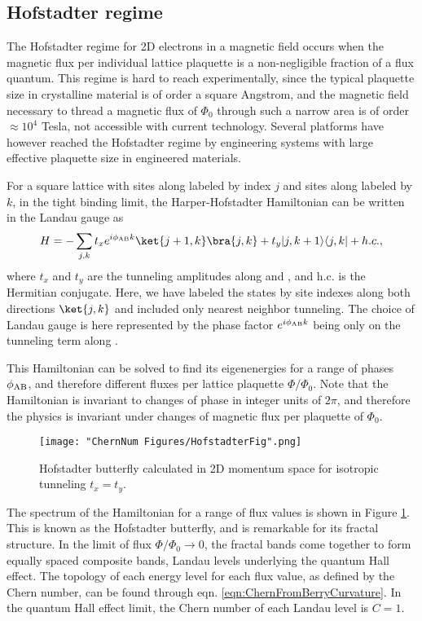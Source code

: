 \subsection{Hofstadter regime}
The Hofstadter regime\cite{Hofstadter1976} for 2D electrons in a magnetic field occurs when the magnetic flux per individual lattice plaquette is a non-negligible fraction of a flux quantum. This regime is hard to reach experimentally, since the typical plaquette size in crystalline material is of order a square Angstrom, and the magnetic field necessary to thread a magnetic flux of $\Phi_0$ through such a narrow area is of order $\approx10^4$ Tesla, not accessible with current technology. Several platforms have however reached the Hofstadter regime by engineering systems with large effective plaquette size in engineered materials\cite{Geisler2004,Hunt2013}.

For a square lattice with sites along \ex{} labeled by index $j$ and sites along \ey{} labeled by $k$, in the tight binding limit, the Harper-Hofstadter Hamiltonian can be written in the Landau gauge as
\begin{equation}
H=-\sum_{j,k} t_x e^{i\phi_{\rm AB}k}\ket{j+1,k}\bra{j,k}+t_y|j,k+1\rangle\langle j,k| +  h.c.,
\label{eqn:hofstadterHam}
\end{equation} 
where $t_x$ and $t_y$ are the tunneling amplitudes along \ex{} and \ey{}, and h.c. is the Hermitian conjugate. Here, we have labeled the states by site indexes along both directions $\ket{j,k}$ and included only nearest neighbor tunneling. The choice of Landau gauge is here represented by the phase factor $e^{i\phi_{\rm AB}k}$ being only on the tunneling term along \ex{}.

This Hamiltonian can be solved to find its eigenenergies for a range of phases  $\phi_{\rm AB}$, and therefore different fluxes per lattice plaquette $\Phi/\Phi_0$. Note that the Hamiltonian is invariant to changes of phase in integer units of $2\pi$, and therefore the physics is invariant under changes of magnetic flux per plaquette of $\Phi_0$. 

\begin{figure}
	\texttt{[image: "ChernNum Figures/HofstadterFig".png]}
\label{fig:Hofstadter}
\caption[Hofstadter butterfly]{Hofstadter butterfly calculated in 2D momentum space for isotropic tunneling $t_x=t_y$.}
\end{figure}
The spectrum of the Hamiltonian for a range of flux values is shown in Figure \ref{fig:Hofstadter}. This is known as the Hofstadter butterfly, and is remarkable for its fractal structure. In the limit of flux $\Phi/\Phi_0\rightarrow0$, the fractal bands come together to form equally spaced composite bands, Landau levels underlying the quantum Hall effect\cite{Ando1975,Klitzing1980,Laughlin1981}. The topology of each energy level for each flux value, as defined by the Chern number, can be found through eqn. \ref{eqn:ChernFromBerryCurvature}. In the quantum Hall effect limit, the Chern number of each Landau level is $C=1$.

